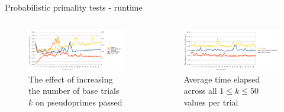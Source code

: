 \documentclass[pdf,aspectratio=169]{beamer}
\begin{document}
\begin{frame}{Probabilistic primality tests - runtime}
    \begin{columns}[t, onlytextwidth]
        \begin{column}{0.48\textwidth}
            \begin{figure}
                \setcounter{figure}{2}
                \caption{The effect of increasing the number of base trials $k$ on pseudoprimes passed}
                \centering
                \includegraphics[width=\textwidth]{time_v_bases}
            \end{figure}
        \end{column}
        \begin{column}{0.48\textwidth}
            \begin{figure}
                \setcounter{figure}{3}
                \caption{Average time elapsed across all $1 \leq k \leq 50$ values per trial}
                \centering
                \includegraphics[width=\textwidth]{time_v_trial}
            \end{figure}
        \end{column}
    \end{columns}
    \begin{outline}
    \end{outline}
\end{frame}
\end{document}
